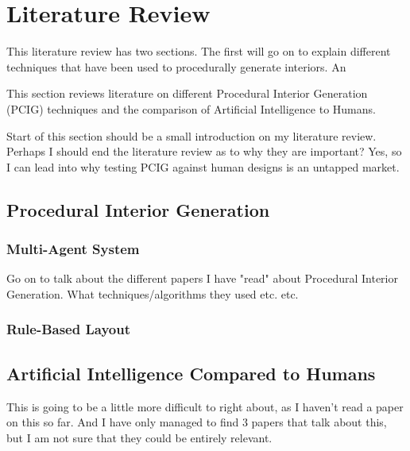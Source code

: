 \section{Literature Review}

This literature review has two sections. The first will go on to 
explain different techniques that 
have been used to procedurally generate interiors.
An

This section reviews literature on different Procedural Interior Generation (PCIG) techniques 
and the comparison of Artificial Intelligence to Humans.

Start of this section should be a small introduction on my literature review.
\\
Perhaps I should end the literature review as to why they are important?
Yes, so I can lead into why testing PCIG against human designs is an untapped market.

\subsection{Procedural Interior Generation}

\subsubsection*{Multi-Agent System}
Go on to talk about the different papers I have "read" about Procedural Interior Generation.
What techniques/algorithms they used etc. etc. \cite{real-time-walkthroughs}
\subsubsection*{Rule-Based Layout}
\subsubsection*{}


\subsection{Artificial Intelligence Compared to Humans}
This is going to be a little more difficult to right about, as I haven't read a paper on this so far.
And I have only managed to find 3 papers that talk about this, but I am not sure that they could be entirely relevant.